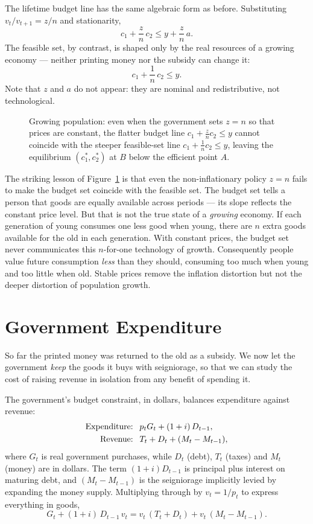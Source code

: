 The lifetime budget line has the same algebraic form as before. Substituting $v_t/v_{t+1} = z/n$ and stationarity,
\[
c_1 + \frac{z}{n}\,c_2 \le y + \frac{z}{n}\,a .
\]
The feasible set, by contrast, is shaped only by the real resources of a growing economy --- neither printing money nor the subsidy can change it:
\[
c_1 + \frac{1}{n}\,c_2 \le y .
\]
Note that $z$ and $a$ do not appear: they are nominal and redistributive, not technological.

\begin{figure}[h]
\centering

\caption{Growing population: even when the government sets $z=n$ so that prices are constant, the flatter budget line $c_1 + \tfrac{z}{n}c_2 \le y$ cannot coincide with the steeper feasible-set line $c_1 + \tfrac{1}{n}c_2 \le y$, leaving the equilibrium $(c_1^*,c_2^*)$ at $B$ below the efficient point $A$.}
\label{fig:money-6}
\end{figure}

The striking lesson of Figure~\ref{fig:money-6} is that even the non-inflationary policy $z=n$ fails to make the budget set coincide with the feasible set. The budget set tells a person that goods are equally available across periods --- its slope reflects the constant price level. But that is not the true state of a \emph{growing} economy. If each generation of young consumes one less good when young, there are $n$ extra goods available for the old in each generation. With constant prices, the budget set never communicates this $n$-for-one technology of growth. Consequently people value future consumption \emph{less} than they should, consuming too much when young and too little when old. Stable prices remove the inflation distortion but not the deeper distortion of population growth.

\section{Government Expenditure}

So far the printed money was returned to the old as a subsidy. We now let the government \emph{keep} the goods it buys with seigniorage, so that we can study the cost of raising revenue in isolation from any benefit of spending it.

The government's budget constraint, in dollars, balances expenditure against revenue:
\[
\begin{aligned}
\text{Expenditure: }&\ p_t G_t + (1+i)\,D_{t-1},\\
\text{Revenue: }&\ T_t + D_t + (M_t - M_{t-1}),
\end{aligned}
\]
where $G_t$ is real government purchases, while $D_t$ (debt), $T_t$ (taxes) and $M_t$ (money) are in dollars. The term $(1+i)D_{t-1}$ is principal plus interest on maturing debt, and $(M_t - M_{t-1})$ is the seigniorage implicitly levied by expanding the money supply. Multiplying through by $v_t = 1/p_t$ to express everything in goods,
\[
G_t + (1+i)\,D_{t-1}\,v_t = v_t\,(T_t + D_t) + v_t\,(M_t - M_{t-1}).
\]

